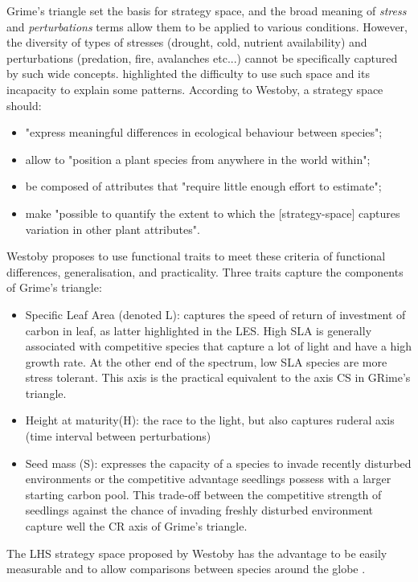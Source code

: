 Grime's triangle set the basis for strategy space, and the broad meaning of \textit{stress} and \textit{perturbations} terms allow them to be applied to various conditions. However, the diversity of types of stresses (drought, cold, nutrient availability) and perturbations (predation, fire, avalanches etc...) cannot be specifically captured by such wide concepts. \citet{westoby_leaf-height-seed_1998} highlighted the difficulty to use such space and its incapacity to explain some patterns. According to Westoby, a strategy space should: 
\begin{itemize}
\item "express meaningful differences in ecological behaviour between species";
\item allow to "position a plant species from anywhere in the world within";
\item be composed of attributes that "require little enough effort to estimate";
\item make "possible to quantify the extent to which the [strategy-space] captures variation in other plant attributes".
\end{itemize}
Westoby proposes to use functional traits to meet these criteria of functional differences, generalisation, and practicality. Three traits capture the components of Grime's triangle:
\begin{itemize}
\item Specific Leaf Area (denoted L): captures the speed of return of investment of carbon in leaf, as latter highlighted in the LES. High SLA is generally associated with competitive species that capture a lot of light and have a high growth rate. At the other end of the spectrum, low SLA species are more stress tolerant. This axis is the practical equivalent to the axis CS in GRime's triangle.
\item Height at maturity(H): the race to the light, but also captures ruderal axis (time interval between perturbations)
\item Seed mass (S): expresses the capacity of a species to invade recently disturbed environments or the competitive advantage seedlings possess with a larger starting carbon pool. This trade-off between the competitive strength of seedlings against the chance of invading freshly disturbed environment capture well the CR axis of Grime's triangle.
\end{itemize}

The LHS strategy space proposed by Westoby has the advantage to be easily measurable and to allow comparisons between species around the globe \parencite{pierce_allocating_2013}.

